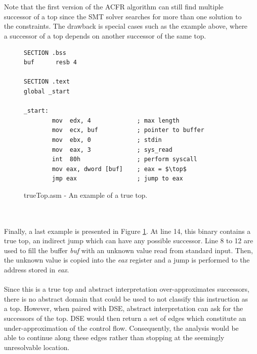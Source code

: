 \documentclass{kththesis}
\renewcommand{\it}[1]{\textit{#1}}
\begin{document}
\\ \\
Note that the first version of the ACFR algorithm can still find multiple successor of a top since the SMT solver searches for more than one solution to the constraints. The drawback is special cases such as the example above, where a successor of a top depends on another successor of the same top.
\begin{figure}[ht]
    \centering
\begin{tcolorbox}
\begin{verbatim}
SECTION .bss
buf      resb 4

SECTION .text
global _start

_start:
        mov  edx, 4             ; max length
        mov  ecx, buf           ; pointer to buffer
        mov  ebx, 0             ; stdin
        mov  eax, 3             ; sys_read
        int  80h                ; perform syscall
        mov eax, dword [buf]    ; eax = $\top$
        jmp eax                 ; jump to eax
\end{verbatim}
\end{tcolorbox}
\caption{trueTop.asm - An example of a true top.}
    \label{fig:trueTop.asm}
\end{figure}
\\ \\ 
Finally, a last example is presented in Figure \ref{fig:trueTop.asm}. At line 14, this binary contains a true top, an indirect jump which can have any possible successor. Line 8 to 12 are used to fill the buffer \it{buf} with an unknown value read from standard input. Then, the unknown value is copied into the \it{eax} register and a jump is performed to the address stored in \it{eax}.
\\ \\
Since this is a true top and abstract interpretation over-approximates successors, there is no abstract domain that could be used to not classify this instruction as a top. However, when paired with DSE, abstract interpretation can ask for the successors of the top. DSE would then return a set of edges which constitute an under-approximation of the control flow. Consequently, the analysis would be able to continue along these edges rather than stopping at the seemingly unresolvable location.
\end{document}
